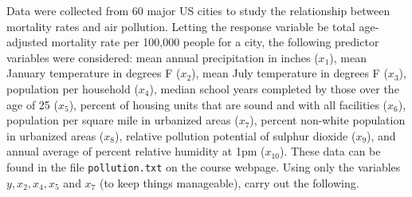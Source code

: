\documentclass{homework}
\begin{document}
\begin{longproblem}
  Data were collected from 60 major US cities to study the relationship between mortality rates and air pollution.  Letting the response variable be total age-adjusted mortality rate per 100,000 people for a city, the following predictor variables were considered: mean annual precipitation in inches ($x_1$), mean January temperature in degrees F ($x_2$), mean July temperature in degrees F ($x_3$), population per household ($x_4$), median school years completed by those over the age of 25 ($x_5$), percent of housing units that are sound and with all facilities ($x_6$), population per square mile in urbanized areas ($x_7$), percent non-white population in urbanized areas ($x_8$), relative pollution potential of sulphur dioxide ($x_9$), and annual average of percent relative humidity at 1pm ($x_{10}$).  These data can be found in the file \texttt{pollution.txt} on the course webpage.  Using only the variables $y,x_2,x_4,x_5$ and $x_7$ (to keep things manageable), carry out the following.



\end{longproblem}
\end{document}
